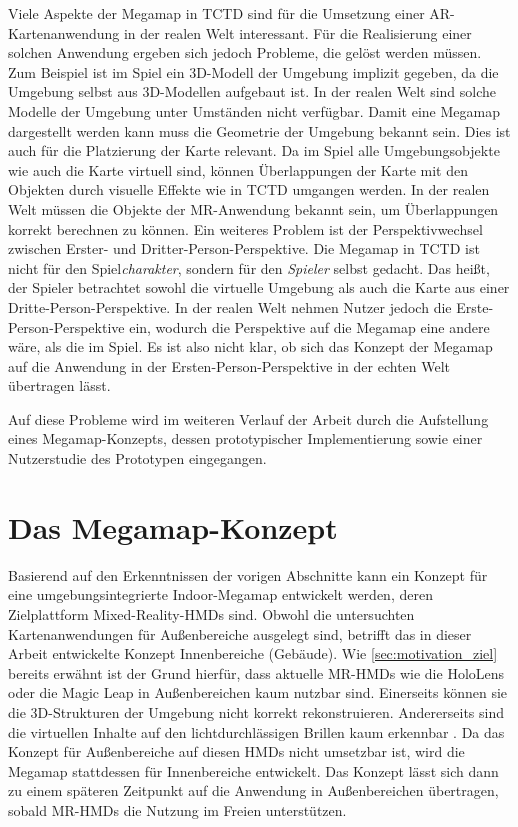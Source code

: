 Viele Aspekte der Megamap in TCTD sind für die Umsetzung einer AR-Kartenanwendung in der realen Welt interessant.
Für die Realisierung einer solchen Anwendung ergeben sich jedoch Probleme, die gelöst werden müssen.
Zum Beispiel ist im Spiel ein 3D-Modell der Umgebung implizit gegeben, da die Umgebung selbst aus 3D-Modellen aufgebaut ist.
In der realen Welt sind solche Modelle der Umgebung unter Umständen nicht verfügbar.
Damit eine Megamap dargestellt werden kann muss die Geometrie der Umgebung bekannt sein.
Dies ist auch für die Platzierung der Karte relevant.
Da im Spiel alle Umgebungsobjekte wie auch die Karte virtuell sind, können Überlappungen der Karte mit den Objekten durch visuelle Effekte wie in TCTD umgangen werden.
In der realen Welt müssen die Objekte der MR-Anwendung bekannt sein, um Überlappungen korrekt berechnen zu können.
Ein weiteres Problem ist der Perspektivwechsel zwischen Erster- und Dritter-Person-Perspektive.
Die Megamap in TCTD ist nicht für den Spiel\emph{charakter}, sondern für den \emph{Spieler} selbst gedacht.
Das heißt, der Spieler betrachtet sowohl die virtuelle Umgebung als auch die Karte aus einer Dritte-Person-Perspektive.
In der realen Welt nehmen Nutzer jedoch die Erste-Person-Perspektive ein, wodurch die Perspektive auf die Megamap eine andere wäre, als die im Spiel.
Es ist also nicht klar, ob sich das Konzept der Megamap auf die Anwendung in der Ersten-Person-Perspektive in der echten Welt übertragen lässt.

Auf diese Probleme wird im weiteren Verlauf der Arbeit durch die Aufstellung eines Megamap-Konzepts, dessen prototypischer Implementierung sowie einer Nutzerstudie des Prototypen eingegangen.

\section{Das Megamap-Konzept}
Basierend auf den Erkenntnissen der vorigen Abschnitte kann ein Konzept für eine umgebungsintegrierte Indoor-Megamap entwickelt werden, deren Zielplattform Mixed-Reality-HMDs sind.
Obwohl die untersuchten Kartenanwendungen für Außenbereiche ausgelegt sind, betrifft das in dieser Arbeit entwickelte Konzept Innenbereiche (Gebäude).
Wie \autoref{sec:motivation_ziel} bereits erwähnt ist der Grund hierfür, dass aktuelle MR-HMDs wie die HoloLens oder die Magic Leap in Außenbereichen kaum nutzbar sind.
Einerseits können sie die 3D-Strukturen der Umgebung nicht korrekt rekonstruieren.
Andererseits sind die virtuellen Inhalte auf den lichtdurchlässigen Brillen kaum erkennbar \parencite{Schroeder2017, Strange2018}.
Da das Konzept für Außenbereiche auf diesen HMDs nicht umsetzbar ist, wird die Megamap stattdessen für Innenbereiche entwickelt.
Das Konzept lässt sich dann zu einem späteren Zeitpunkt auf die Anwendung in Außenbereichen übertragen, sobald MR-HMDs die Nutzung im Freien unterstützen.

